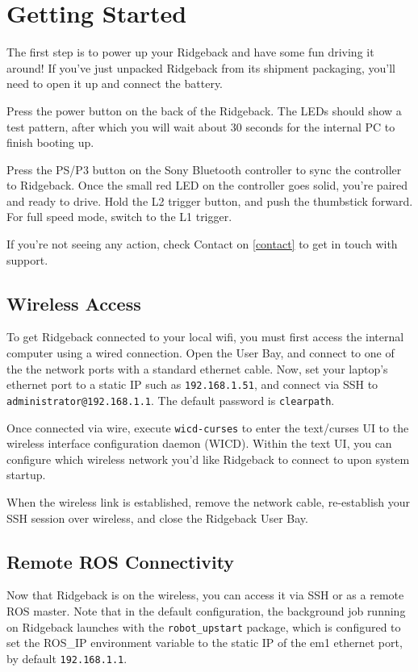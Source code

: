 \documentclass[]{clearpath-latex/clearpath-manual}
\begin{document}
\section{Getting Started}

The first step is to power up your Ridgeback and have some fun driving it around! If you’ve just unpacked Ridgeback
from its shipment packaging, you’ll need to open it up and connect the battery.

Press the power button on the back of the Ridgeback. The LEDs should show a test pattern, after which you will
wait about 30 seconds for the internal PC to finish booting up.

Press the PS/P3 button on the Sony Bluetooth controller to sync the controller to Ridgeback. Once the small red
LED on the controller goes solid, you’re paired and ready to drive. Hold the L2 trigger button, and push the
thumbstick forward. For full speed mode, switch to the L1 trigger.

If you’re not seeing any action, check Contact on \autoref{contact} to get in touch with support.

\subsection{Wireless Access}

To get Ridgeback connected to your local wifi, you must first access the internal computer using a wired connection.
Open the User Bay, and connect to one of the the network ports with a standard
ethernet cable. Now, set your laptop’s ethernet port to a static IP such as \lstinline{192.168.1.51}, and connect via SSH
to \lstinline{administrator@192.168.1.1}. The default password is \lstinline{clearpath}.

Once connected via wire, execute \lstinline{wicd-curses} to enter the text/curses UI to the wireless interface configuration daemon (WICD). Within the text UI, you can configure which wireless network you’d like Ridgeback to connect to upon system startup.

When the wireless link is established, remove the network cable, re-establish your SSH session over wireless,
and close the Ridgeback User Bay.

\subsection{Remote ROS Connectivity}

Now that Ridgeback is on the wireless, you can access it via SSH or as a remote ROS master. Note that in
the default configuration, the background job running on Ridgeback launches with the \lstinline{robot_upstart} package,
which is configured to set the ROS\_IP environment variable to the static IP of the em1 ethernet port, by default
\lstinline{192.168.1.1}.
\end{document}

